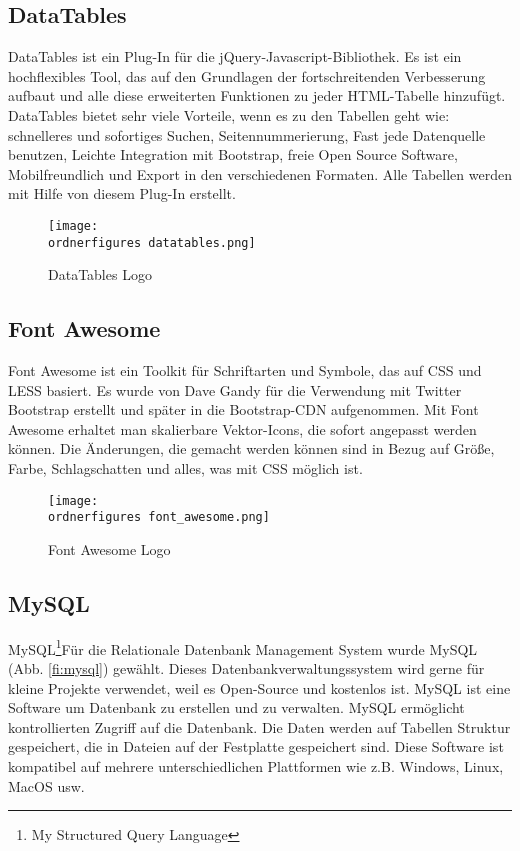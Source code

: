\subsection{DataTables}

DataTables ist ein Plug-In f\"{u}r die jQuery-Javascript-Bibliothek. Es ist ein hochflexibles Tool, das auf den Grundlagen der fortschreitenden Verbesserung aufbaut und alle diese erweiterten Funktionen zu jeder HTML-Tabelle hinzuf\"{u}gt. DataTables bietet sehr viele Vorteile, wenn es zu den Tabellen geht wie: schnelleres und sofortiges Suchen, Seitennummerierung, Fast jede Datenquelle benutzen, Leichte Integration mit Bootstrap, freie Open Source Software, Mobilfreundlich und Export in den verschiedenen Formaten. Alle Tabellen werden mit Hilfe von diesem Plug-In erstellt.\cite{40_datatables}

\begin{figure}[H]
	\centering
	\texttt{[image: \\ordnerfigures datatables.png]}
	\caption{DataTables Logo\cite{40_datatables_img}}
	\label{fi:datatables}
\end{figure}


\subsection{Font Awesome}
Font Awesome ist ein Toolkit für Schriftarten und Symbole, das auf CSS und LESS basiert. Es wurde von Dave Gandy für die Verwendung mit Twitter Bootstrap erstellt und später in die Bootstrap-CDN aufgenommen. Mit Font Awesome erhaltet man skalierbare Vektor-Icons, die sofort angepasst werden können. Die Änderungen, die gemacht werden können sind in Bezug auf Größe, Farbe, Schlagschatten und alles, was mit CSS möglich ist.

\begin{figure}[H]
	\centering
	\texttt{[image: \\ordnerfigures font\_awesome.png]}
	\caption{Font Awesome Logo\cite{40_font_awesome_img}}
	\label{fi:datatables}
\end{figure}


\subsection{MySQL}

MySQL\footnote{My Structured Query Language}F\"{u}r die Relationale Datenbank Management System wurde MySQL (Abb. \ref{fi:mysql}) gew\"{a}hlt. Dieses Datenbankverwaltungssystem wird gerne f\"{u}r kleine Projekte verwendet, weil es Open-Source und kostenlos ist. MySQL ist eine Software um Datenbank zu erstellen und zu verwalten. MySQL erm\"{o}glicht kontrollierten Zugriff auf die Datenbank. Die Daten werden auf Tabellen Struktur gespeichert, die in Dateien auf der Festplatte gespeichert sind. Diese Software ist kompatibel auf mehrere unterschiedlichen Plattformen wie z.B. Windows, Linux, MacOS usw.

